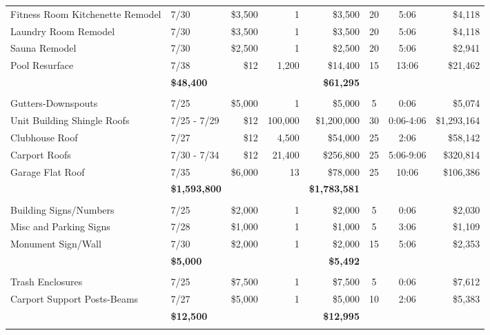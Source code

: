 \documentclass[11pt,letterpaper]{article}
\begin{document}
\begin{longtable}{p{4.2cm} p{1.6cm} r r r c c r}
\rowcolor{blue!12} Fitness Room Kitchenette Remodel & 7/30 & \$3,500 & 1 & \$3,500 & 20 & 5:06 & \$4,118 \\
Laundry Room Remodel & 7/30 & \$3,500 & 1 & \$3,500 & 20 & 5:06 & \$4,118 \\
\rowcolor{blue!12} Sauna Remodel & 7/30 & \$2,500 & 1 & \$2,500 & 20 & 5:06 & \$2,941 \\
Pool Resurface & 7/38 & \$12 & 1,200 & \$14,400 & 15 & 13:06 & \$21,462 \\
\addlinespace[1pt] \multicolumn{4}{r}{} & \textbf{\$48,400} & & & \textbf{\$61,295} \\
\addlinespace[6pt]
\multicolumn{8}{l}{\textbf{Roofing}} \\
\rowcolor{blue!12} Gutters-Downspouts & 7/25 & \$5,000 & 1 & \$5,000 & 5 & 0:06 & \$5,074 \\
Unit Building Shingle Roofs & 7/25 - 7/29 & \$12 & 100,000 & \$1,200,000 & 30 & 0:06-4:06 & \$1,293,164 \\
\rowcolor{blue!12} Clubhouse Roof & 7/27 & \$12 & 4,500 & \$54,000 & 25 & 2:06 & \$58,142 \\
Carport Roofs & 7/30 - 7/34 & \$12 & 21,400 & \$256,800 & 25 & 5:06-9:06 & \$320,814 \\
\rowcolor{blue!12} Garage Flat Roof & 7/35 & \$6,000 & 13 & \$78,000 & 25 & 10:06 & \$106,386 \\
\addlinespace[1pt] \multicolumn{4}{r}{} & \textbf{\$1,593,800} & & & \textbf{\$1,783,581} \\
\addlinespace[6pt]
\multicolumn{8}{l}{\textbf{Signage}} \\
Building Signs/Numbers & 7/25 & \$2,000 & 1 & \$2,000 & 5 & 0:06 & \$2,030 \\
\rowcolor{blue!12} Misc and Parking Signs & 7/28 & \$1,000 & 1 & \$1,000 & 5 & 3:06 & \$1,109 \\
Monument Sign/Wall & 7/30 & \$2,000 & 1 & \$2,000 & 15 & 5:06 & \$2,353 \\
\addlinespace[1pt] \multicolumn{4}{r}{} & \textbf{\$5,000} & & & \textbf{\$5,492} \\
\addlinespace[6pt]
\multicolumn{8}{l}{\textbf{Structural}} \\
\rowcolor{blue!12} Trash Enclosures & 7/25 & \$7,500 & 1 & \$7,500 & 5 & 0:06 & \$7,612 \\
Carport Support Posts-Beams & 7/27 & \$5,000 & 1 & \$5,000 & 10 & 2:06 & \$5,383 \\
\addlinespace[1pt] \multicolumn{4}{r}{} & \textbf{\$12,500} & & & \textbf{\$12,995} \\
\addlinespace[6pt]
\bottomrule
\end{longtable}
\end{document}
